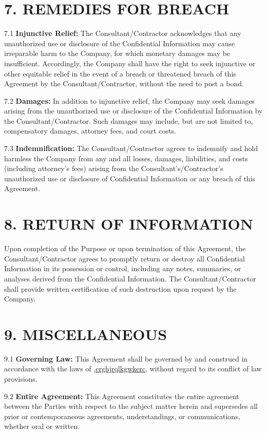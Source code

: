 \documentclass[12pt]{article}
\begin{document}
\section*{7. REMEDIES FOR BREACH}

7.1 \textbf{Injunctive Relief:} The Consultant/Contractor acknowledges that any unauthorized use or disclosure of the Confidential Information may cause irreparable harm to the Company, for which monetary damages may be insufficient. Accordingly, the Company shall have the right to seek injunctive or other equitable relief in the event of a breach or threatened breach of this Agreement by the Consultant/Contractor, without the need to post a bond.

7.2 \textbf{Damages:} In addition to injunctive relief, the Company may seek damages arising from the unauthorized use or disclosure of the Confidential Information by the Consultant/Contractor. Such damages may include, but are not limited to, compensatory damages, attorney fees, and court costs.

7.3 \textbf{Indemnification:} The Consultant/Contractor agrees to indemnify and hold harmless the Company from any and all losses, damages, liabilities, and costs (including attorney’s fees) arising from the Consultant’s/Contractor’s unauthorized use or disclosure of Confidential Information or any breach of this Agreement.

\section*{8. RETURN OF INFORMATION}

Upon completion of the Purpose or upon termination of this Agreement, the Consultant/Contractor agrees to promptly return or destroy all Confidential Information in its possession or control, including any notes, summaries, or analyses derived from the Confidential Information. The Consultant/Contractor shall provide written certification of such destruction upon request by the Company.

\section*{9. MISCELLANEOUS}

9.1 \textbf{Governing Law:} This Agreement shall be governed by and construed in accordance with the laws of \underline{,erghjrqlkgwkerc}, without regard to its conflict of law provisions.

9.2 \textbf{Entire Agreement:} This Agreement constitutes the entire agreement between the Parties with respect to the subject matter herein and supersedes all prior or contemporaneous agreements, understandings, or communications, whether oral or written.
\end{document}
